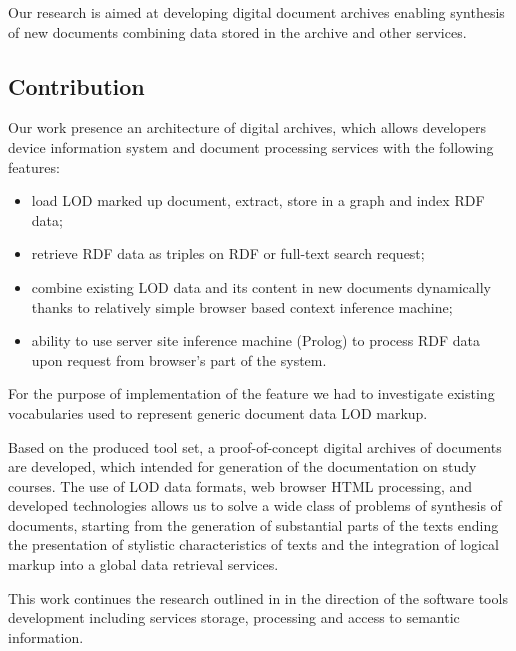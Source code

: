 \documentclass[12pt]{llncs}
\begin{document}
Our research is aimed at developing digital document archives enabling
synthesis of new documents combining data stored in the archive and other
services.

\subsection{Contribution}
\label{sec:contr}

Our work presence an architecture of digital archives, which allows
developers device information system and document processing services
with the following features:
\begin{itemize}
\item load LOD marked up document, extract, store in a graph and index RDF data;
\item retrieve RDF data as triples on RDF or full-text search request;
\item combine existing LOD data and its content in new documents dynamically
  thanks to relatively simple browser based context inference machine;
\item ability to use server site inference machine (Prolog) to process RDF data upon
  request from browser's part of the system.
\end{itemize}

For the purpose of implementation of the feature we had to investigate existing
vocabularies used to represent generic document data LOD markup.


Based on the produced tool set, a proof-of-concept digital archives of
documents are
developed, which intended for generation of the documentation on study
courses. The use of LOD data formats, web browser HTML processing, and
developed technologies allows us to solve a wide class of problems of
synthesis of documents, starting from the generation of substantial
parts of the texts ending the presentation of stylistic characteristics
of texts and the integration of logical markup into a global data
retrieval services.

This work continues the research outlined in \cite{b2} in the direction of
the software tools development including services storage, processing
and access to semantic information.
\end{document}
